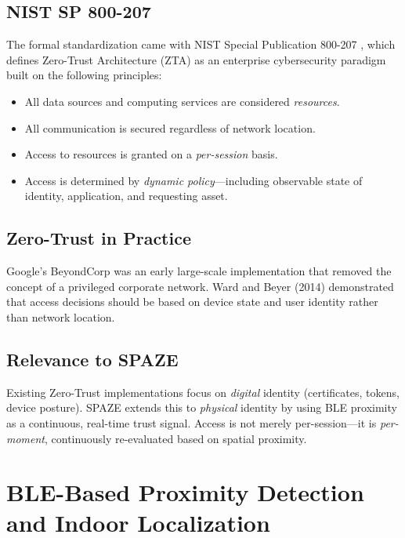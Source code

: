 \documentclass[conference]{IEEEtran}
\begin{document}
\subsection{NIST SP 800-207}
The formal standardization came with NIST Special Publication 800-207 \cite{nist_zerotrust}, which defines Zero-Trust Architecture (ZTA) as an enterprise cybersecurity paradigm built on the following principles:
\begin{itemize}[noitemsep]
    \item All data sources and computing services are considered \textit{resources}.
    \item All communication is secured regardless of network location.
    \item Access to resources is granted on a \textit{per-session} basis.
    \item Access is determined by \textit{dynamic policy}—including observable state of identity, application, and requesting asset.
\end{itemize}

\subsection{Zero-Trust in Practice}
Google's BeyondCorp \cite{beyondcorp} was an early large-scale implementation that removed the concept of a privileged corporate network. Ward and Beyer (2014) demonstrated that access decisions should be based on device state and user identity rather than network location.

\subsection{Relevance to SPAZE}
Existing Zero-Trust implementations focus on \textit{digital} identity (certificates, tokens, device posture). SPAZE extends this to \textit{physical} identity by using BLE proximity as a continuous, real-time trust signal. Access is not merely per-session—it is \textit{per-moment}, continuously re-evaluated based on spatial proximity.

\section{BLE-Based Proximity Detection and Indoor Localization}
\label{sec:ble}
\end{document}
